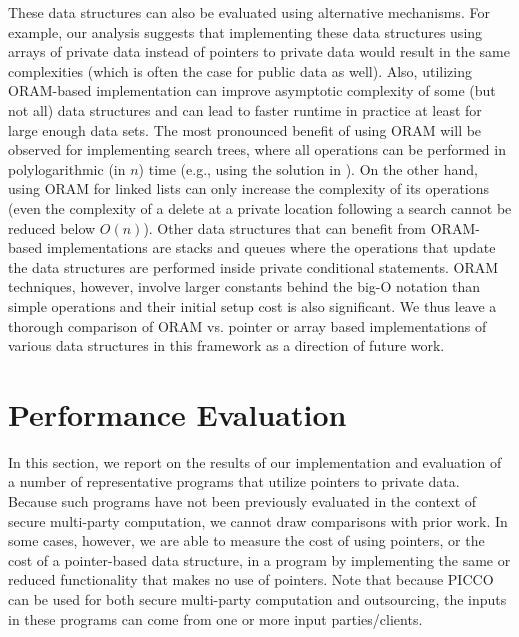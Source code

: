 \documentclass[11pt]{article}
\begin{document}
These data structures can also be evaluated using alternative mechanisms.
For example, our analysis suggests that implementing these data structures
using arrays of private data instead of pointers to private data would
result in the same complexities (which is often the case for public data as
well). Also, utilizing ORAM-based implementation can improve asymptotic
complexity of some (but not all) data structures and can lead to faster
runtime in practice at least for large enough data sets. The most pronounced
benefit of using ORAM will be observed for implementing search trees, where
all operations can be performed in polylogarithmic (in $n$) time (e.g.,
using the solution in \cite{Wang14}). On the other hand, using ORAM for
linked lists can only increase the complexity of its operations (even the
complexity of a delete at a private location following a search cannot be
reduced below $O(n)$). Other data structures that can benefit from
ORAM-based implementations are stacks and queues where the operations that
update the data structures are performed inside private conditional
statements. ORAM techniques, however, involve larger constants behind the
big-O notation than simple operations and their initial setup cost is also
significant. We thus leave a thorough comparison of ORAM vs. pointer or
array based implementations of various data structures in this framework as
a direction of future work.

\section{Performance Evaluation}
\label{sec:perf}

In this section, we report on the results of our implementation and
evaluation of a number of representative programs that utilize pointers to
private data. Because such programs have not been previously evaluated in
the context of secure multi-party computation, we cannot draw comparisons
with prior work. In some cases, however, we are able to measure the cost of
using pointers, or the cost of a pointer-based data structure, in a program by
implementing the same or reduced functionality that makes no use of pointers. 
Note that because PICCO can be used for both secure multi-party computation
and outsourcing, the inputs in these programs can come from one or more
input parties/clients.
\end{document}
